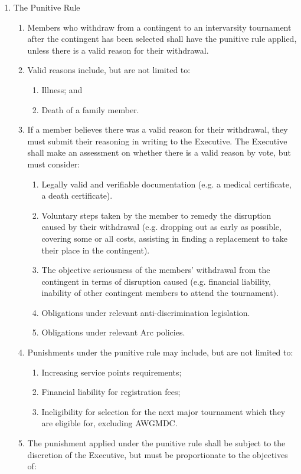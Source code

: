 \begin{enumerate}
\item The Punitive Rule
  \begin{enumerate}
  \item Members who withdraw from a contingent to an intervarsity tournament after the contingent has been selected shall have the punitive rule applied, unless there is a valid reason for their withdrawal.
  \item Valid reasons include, but are not limited to:
    \begin{enumerate}
    \item Illness; and
    \item Death of a family member.
    \end{enumerate}
  \item If a member believes there was a valid reason for their withdrawal, they must submit their reasoning in writing to the Executive. The Executive shall make an assessment on whether there is a valid reason by vote, but must consider:
    \begin{enumerate}
    \item Legally valid and verifiable documentation (e.g. a medical certificate, a death certificate).
    \item Voluntary steps taken by the member to remedy the disruption caused by their withdrawal (e.g. dropping out as early as possible, covering some or all costs, assisting in finding a replacement to take their place in the contingent).
    \item The objective seriousness of the members’ withdrawal from the contingent in terms of disruption caused (e.g. financial liability, inability of other contingent members to attend the tournament).
    \item Obligations under relevant anti-discrimination legislation.
    \item Obligations under relevant Arc policies.
    \end{enumerate}
  \item Punishments under the punitive rule may include, but are not limited to:
    \begin{enumerate}
    \item Increasing service points requirements;
    \item Financial liability for registration fees;
    \item Ineligibility for selection for the next major tournament which they are eligible for, excluding AWGMDC.
    \end{enumerate}
  \item The punishment applied under the punitive rule shall be subject to the discretion of the Executive, but must be proportionate to the objectives of:

\end{enumerate}
\end{enumerate}
